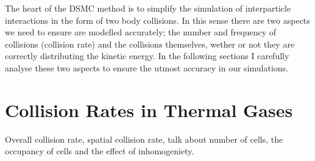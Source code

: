 The heart of the DSMC method is to simplify the simulation of interparticle interactions in the form of two body collisions.
In this sense there are two aspects we need to ensure are modelled accurately; the number and frequency of collisions (collision rate) and the collisions themselves, wether or not they are correctly distributing the kinetic energy.
In the following sections I carefully analyse these two aspects to ensure the utmost accuracy in our simulations.


\section{Collision Rates in Thermal Gases}

Overall collision rate, spatial collision rate, talk about number of cells, the occupancy of cells and the effect of inhomogeniety.
 
